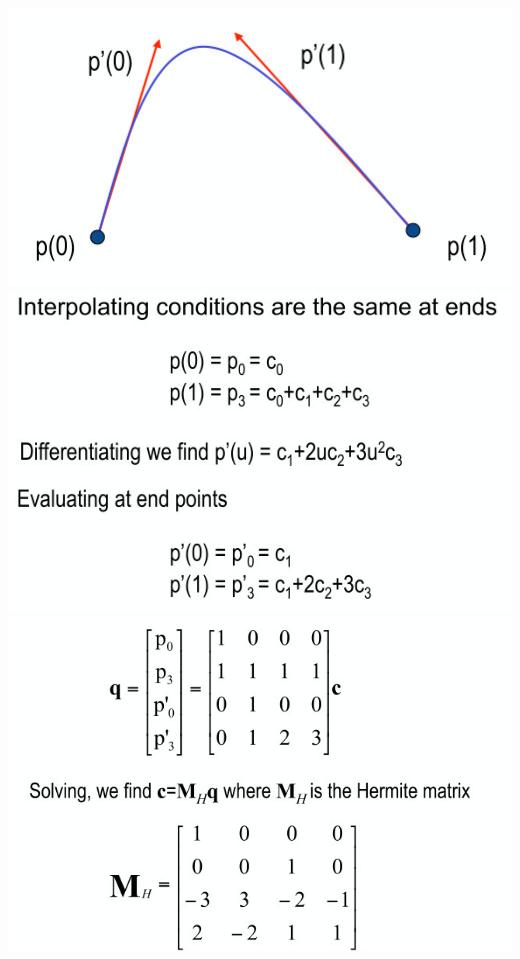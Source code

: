 \documentclass[11pt,a4paper]{article}
\begin{document}
\begin{itemize}
		\begin{center}
			\includegraphics[scale=0.5]{pictures/hermiteform.jpg} \\
			\includegraphics[scale=0.5]{pictures/hermiteequations.jpg} \\
			\includegraphics[scale=0.5]{pictures/hermitematrix.jpg} \\

\end{center}
\end{itemize}
\end{document}
